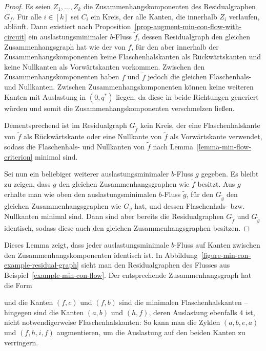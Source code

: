 \begin{proof}
	Es seien $Z_1,\dots, Z_k$ die Zusammenhangskomponenten des Residualgraphen $G_f$.
	Für alle $i\in [k]$ sei $C_i$ ein Kreis, der alle Kanten, die innerhalb $Z_i$ verlaufen, abläuft.
	Dann existiert nach Proposition~\ref{prop-augment-min-con-flow-with-circuit} ein auslastungsminimaler $b$-Fluss $\tilde{f}$, dessen Residualgraph den gleichen Zusammenhangsgraph hat wie der von $f$, für den aber innerhalb der Zusammenhangskomponenten keine Flaschenhalskanten als Rückwärtskanten und keine Nullkanten als Vorwärtskanten vorkommen.
	Zwischen den Zusammenhangskomponenten haben $f$ und $\tilde{f}$ jedoch die gleichen Flaschenhals- und Nullkanten.
	Zwischen Zusammenhangskomponenten können keine weiteren Kanten mit Auslastung in $(0, q^*)$ liegen, da diese in beide Richtungen generiert würden und somit die Zusammenhangskomponenten verschmelzen ließen.
	
	Dementsprechend ist im Residualgraph $G_{\tilde{f}}$ kein Kreis, der eine Flaschenhalskante von $\tilde{f}$ als Rückwärtskante oder eine Nullkante von $\tilde{f}$ als Vorwärtskante verwendet, sodass die Flaschenhals- und Nullkanten von $\tilde{f}$ nach Lemma~\ref{lemma-min-flow-criterion} minimal sind.
	
	Sei nun ein beliebiger weiterer auslastungsminimaler $b$-Fluss $g$ gegeben.
	Es bleibt zu zeigen, dass $g$ den gleichen Zusammenhangsgraphen wie $\tilde{f}$ besitzt.
	Aus $g$ erhalte man wie oben den auslastungsminimalen $b$-Fluss $\tilde{g}$, für den $G_{\tilde{g}}$ den gleichen Zusammenhangsgraphen wie $G_g$ hat, und dessen Flaschenhals- bzw. Nullkanten minimal sind.
	Dann sind aber bereits die Residualgraphen $G_{\tilde{f}}$ und $G_{\tilde{g}}$ identisch, sodass diese auch den gleichen Zusammenhangsgraphen besitzen.
\end{proof}

Dieses Lemma zeigt, dass jeder auslastungsminimale $b$-Fluss auf Kanten zwischen den Zusammenhangskomponenten identisch ist.
In Abbildung~\ref{figure-min-con-example-residual-graph} sieht man den Residualgraphen des Flusses aus Beispiel~\ref{example-min-con-flow}.
Der entsprechende Zusammenhangsgraph hat die Form
\begin{center}
\end{center}
und die Kanten $(f,c)$ und $(f,b)$ sind die minimalen Flaschenhalskanten -- hingegen sind die Kanten $(a,b)$ und $(h,f)$, deren Auslastung ebenfalls $4$ ist, nicht notwendigerweise Flaschenhalskanten: So kann man die Zyklen $(a,b,e,a)$ und $(f,h,i,f)$ augmentieren, um die Auslastung auf den beiden Kanten zu verringern.

